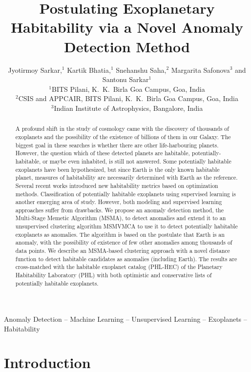 \documentclass[fleqn,usenatbib]{mnras}
\title[Exoplanetary Habitability as Anomaly]{Postulating Exoplanetary Habitability via a Novel Anomaly Detection Method}
\author[Jyotirmoy Sarkar et al.]{
Jyotirmoy Sarkar,$^{1}$
Kartik Bhatia,$^{1}$
Snehanshu Saha,$^{2}$
Margarita Safonova$^{3}$
and Santonu Sarkar$^{1}$\\
$^{1}$BITS Pilani, K.~K.~Birla Goa Campus, Goa, India\\
$^{2}$CSIS and APPCAIR, BITS Pilani, K.~K.~Birla Goa Campus, Goa, India\\
$^{3}$Indian Institute of Astrophysics, Bangalore, India
}
\date{}
\begin{document}
\label{firstpage}
\pagerange{\pageref{firstpage}--\pageref{lastpage}}
\maketitle

\begin{abstract}
A profound shift in the study of cosmology came with the discovery of thousands of exoplanets and the possibility of the existence of billions of them in our Galaxy. The biggest goal in these searches is whether there are other life-harbouring planets. However, the question which of these detected planets are habitable, potentially-habitable, or maybe even inhabited, is still not answered. Some potentially habitable exoplanets have been hypothesized, but since Earth is the only known habitable planet, measures of habitability are necessarily determined with Earth as the reference. Several recent works introduced new habitability metrics based on optimization methods. Classification of potentially habitable exoplanets using supervised learning is another emerging area of study. However, both modeling and supervised learning approaches suffer from drawbacks. We propose an anomaly detection method, the Multi-Stage Memetic Algorithm (MSMA), to detect anomalies and extend it to an unsupervised clustering algorithm MSMVMCA to use it to detect potentially habitable exoplanets as anomalies. The algorithm is based on the postulate that Earth is an anomaly, with the possibility of existence of few other anomalies among thousands of data points. We describe an MSMA-based clustering approach with a novel distance function to detect habitable candidates as anomalies (including Earth). The results are cross-matched with the habitable exoplanet catalog (PHL-HEC) of the Planetary Habitability Laboratory (PHL) with both optimistic and conservative lists of potentially habitable exoplanets. 
\end{abstract}
\begin{keywords}
Anomaly Detection -- Machine Learning -- Unsupervised Learning -- Exoplanets -- Habitability
\end{keywords}
 
\section{Introduction}
\end{document}
